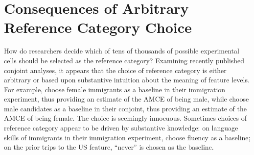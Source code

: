 \documentclass[a4paper,12pt]{article}\usepackage[]{graphicx}\usepackage[]{color}
\begin{document}



\section*{Consequences of Arbitrary Reference Category Choice}\label{sec:challenges}

How do researchers decide which of tens of thousands of possible experimental cells should be selected as the reference category? Examining recently published conjoint analyses, it appears that the choice of reference category is either arbitrary or based upon substantive intuition about the meaning of feature levels. For example, \citet{HainmuellerHopkinsYamamoto2014} choose female immigrants as a baseline in their immigration experiment, thus providing an estimate of the AMCE of being male, while \citet{TeeleKallaRosenbluth2018} choose male candidates as a baseline in their conjoint, thus providing an estimate of the AMCE of being female. The choice is seemingly innocuous. Sometimes choices of reference category appear to be driven by substantive knowledge: on language skills of immigrants in their immigration experiment, \citet{HainmuellerHopkinsYamamoto2014} choose fluency as a baseline; on the prior trips to the US feature, ``never'' is chosen as the baseline.
\end{document}
